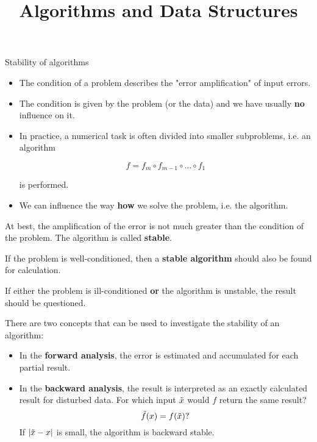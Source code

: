 \documentclass[11pt,compress,t,notes=noshow, xcolor=table]{beamer}
\title{Algorithms and Data Structures}
\begin{document}



\begin{vbframe}{Stability of algorithms}

\begin{itemize}
\item The condition of a problem describes the "error amplification" of input errors.
\item The condition is given by the problem (or the data) and we have usually \textbf{no} influence on it.
\item In practice, a numerical task is often divided into smaller subproblems, i.e. an algorithm

$$
f = f_m \circ f_{m-1} \circ ... \circ f_1
$$

is performed.
\item We can influence the way \textbf{how} we solve the problem, i.e. the algorithm.
\end{itemize}

\framebreak

At best, the amplification of the error is not much greater than the condition of the problem. The algorithm is called \textbf{stable}.

\lz

If the problem is well-conditioned, then a \textbf{stable algorithm} should also be found for calculation.

\lz

If either the problem is ill-conditioned \textbf{or} the algorithm is unstable, the result should be questioned.

\framebreak

There are two concepts that can be used to investigate the stability of an algorithm:

\begin{itemize}
\item In the \textbf{forward analysis}, the error is estimated and accumulated for each partial result.
\item In the \textbf{backward analysis}, the result is interpreted as an exactly calculated result for disturbed data. For which input $\tilde x$ would $f$ return the same result?
$$
\tilde f(x) = f(\tilde x)?
$$
If $|\tilde x - x|$ is small, the algorithm is backward stable.
\end{itemize}


\end{vbframe}
\end{document}
